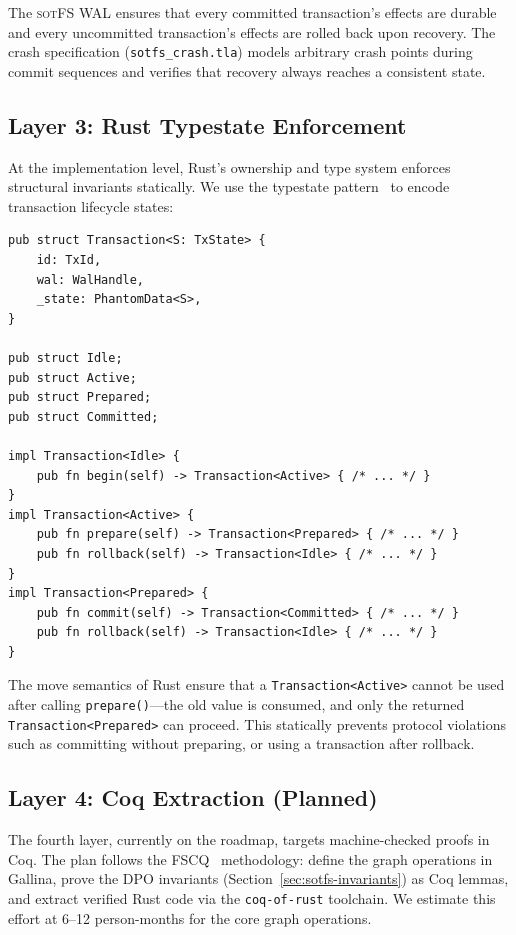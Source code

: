 \documentclass[11pt,a4paper]{article}
\theoremstyle{definition}
\theoremstyle{remark}
\newcommand{\sotfs}{\textsc{sotFS}}
\begin{document}
The \sotfs{} WAL ensures that every committed transaction's effects
are durable and every uncommitted transaction's effects are rolled
back upon recovery. The crash specification
(\texttt{sotfs\_crash.tla}) models arbitrary crash points during
commit sequences and verifies that recovery always reaches a
consistent state.

\subsection{Layer 3: Rust Typestate Enforcement}
\label{sec:verif-typestate}

At the implementation level, Rust's ownership and type system enforces
structural invariants statically. We use the typestate
pattern~\cite{kadekodi2024} to encode transaction lifecycle states:

\begin{lstlisting}[caption={Typestate encoding for transactions.},label=lst:typestate]
pub struct Transaction<S: TxState> {
    id: TxId,
    wal: WalHandle,
    _state: PhantomData<S>,
}

pub struct Idle;
pub struct Active;
pub struct Prepared;
pub struct Committed;

impl Transaction<Idle> {
    pub fn begin(self) -> Transaction<Active> { /* ... */ }
}
impl Transaction<Active> {
    pub fn prepare(self) -> Transaction<Prepared> { /* ... */ }
    pub fn rollback(self) -> Transaction<Idle> { /* ... */ }
}
impl Transaction<Prepared> {
    pub fn commit(self) -> Transaction<Committed> { /* ... */ }
    pub fn rollback(self) -> Transaction<Idle> { /* ... */ }
}
\end{lstlisting}

The move semantics of Rust ensure that a \texttt{Transaction<Active>}
cannot be used after calling \texttt{prepare()}---the old value is
consumed, and only the returned \texttt{Transaction<Prepared>} can
proceed. This statically prevents protocol violations such as
committing without preparing, or using a transaction after rollback.

\subsection{Layer 4: Coq Extraction (Planned)}
\label{sec:verif-coq}

The fourth layer, currently on the roadmap, targets machine-checked
proofs in Coq. The plan follows the FSCQ~\cite{chen2015}
methodology: define the graph operations in Gallina, prove the DPO
invariants (Section~\ref{sec:sotfs-invariants}) as Coq lemmas, and
extract verified Rust code via the \texttt{coq-of-rust} toolchain.
We estimate this effort at 6--12 person-months for the core graph
operations.
\end{document}

